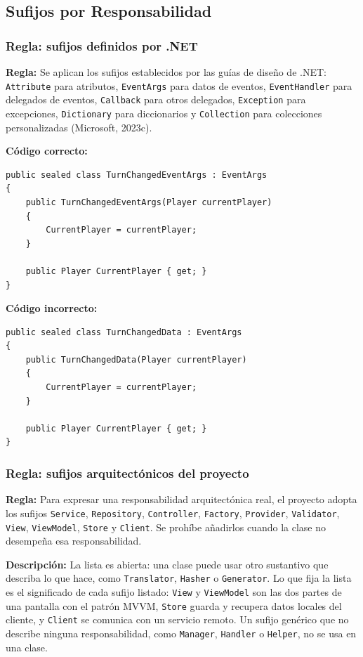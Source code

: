 \subsection{Sufijos por Responsabilidad}

\subsubsection{Regla: sufijos definidos por .NET}

\textbf{Regla:} Se aplican los sufijos establecidos por las guías de diseño de .NET: \texttt{Attribute} para atributos, \texttt{EventArgs} para datos de eventos, \texttt{EventHandler} para delegados de eventos, \texttt{Callback} para otros delegados, \texttt{Exception} para excepciones, \texttt{Dictionary} para diccionarios y \texttt{Collection} para colecciones personalizadas (Microsoft, 2023c).

\textbf{Código correcto:}
\begin{lstlisting}[style=csharpstyle]
public sealed class TurnChangedEventArgs : EventArgs
{
    public TurnChangedEventArgs(Player currentPlayer)
    {
        CurrentPlayer = currentPlayer;
    }

    public Player CurrentPlayer { get; }
}
\end{lstlisting}

\textbf{Código incorrecto:}
\begin{lstlisting}[style=csharpstyle]
public sealed class TurnChangedData : EventArgs
{
    public TurnChangedData(Player currentPlayer)
    {
        CurrentPlayer = currentPlayer;
    }

    public Player CurrentPlayer { get; }
}
\end{lstlisting}

\subsubsection{Regla: sufijos arquitectónicos del proyecto}

\textbf{Regla:} Para expresar una responsabilidad arquitectónica real, el proyecto adopta los sufijos \texttt{Service}, \texttt{Repository}, \texttt{Controller}, \texttt{Factory}, \texttt{Provider}, \texttt{Validator}, \texttt{View}, \texttt{ViewModel}, \texttt{Store} y \texttt{Client}. Se prohíbe añadirlos cuando la clase no desempeña esa responsabilidad.

\textbf{Descripción:} La lista es abierta: una clase puede usar otro sustantivo que describa lo que hace, como \texttt{Translator}, \texttt{Hasher} o \texttt{Generator}. Lo que fija la lista es el significado de cada sufijo listado: \texttt{View} y \texttt{ViewModel} son las dos partes de una pantalla con el patrón MVVM, \texttt{Store} guarda y recupera datos locales del cliente, y \texttt{Client} se comunica con un servicio remoto. Un sufijo genérico que no describe ninguna responsabilidad, como \texttt{Manager}, \texttt{Handler} o \texttt{Helper}, no se usa en una clase.

